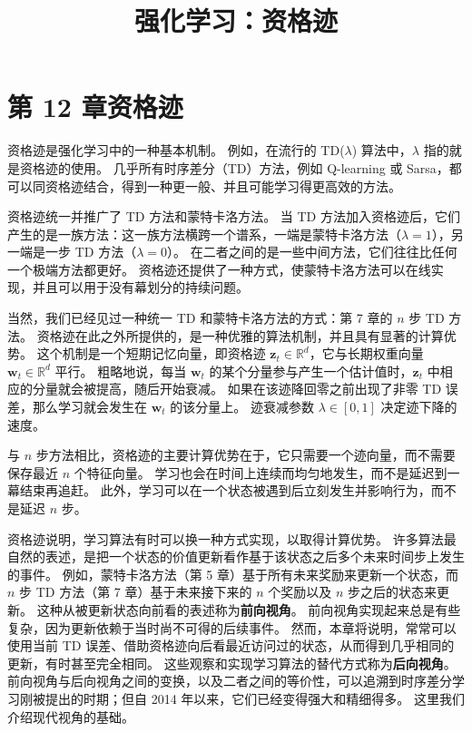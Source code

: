 \documentclass[UTF8, 12pt, fontset=fandol, oneside]{ctexart}
\title{强化学习：资格迹}
\author{}
\date{}
\begin{document}
\maketitle

\section*{第 12 章\quad 资格迹}

资格迹是强化学习中的一种基本机制。
例如，在流行的 TD($\lambda$) 算法中，$\lambda$ 指的就是资格迹的使用。
几乎所有时序差分（TD）方法，例如 Q-learning 或 Sarsa，都可以同资格迹结合，得到一种更一般、并且可能学习得更高效的方法。

资格迹统一并推广了 TD 方法和蒙特卡洛方法。
当 TD 方法加入资格迹后，它们产生的是一族方法：这一族方法横跨一个谱系，一端是蒙特卡洛方法（$\lambda=1$），另一端是一步 TD 方法（$\lambda=0$）。
在二者之间的是一些中间方法，它们往往比任何一个极端方法都更好。
资格迹还提供了一种方式，使蒙特卡洛方法可以在线实现，并且可以用于没有幕划分的持续问题。

当然，我们已经见过一种统一 TD 和蒙特卡洛方法的方式：第 7 章的 $n$ 步 TD 方法。
资格迹在此之外所提供的，是一种优雅的算法机制，并且具有显著的计算优势。
这个机制是一个短期记忆向量，即资格迹 $\mathbf{z}_t\in\mathbb{R}^d$，它与长期权重向量 $\mathbf{w}_t\in\mathbb{R}^d$ 平行。
粗略地说，每当 $\mathbf{w}_t$ 的某个分量参与产生一个估计值时，$\mathbf{z}_t$ 中相应的分量就会被提高，随后开始衰减。
如果在该迹降回零之前出现了非零 TD 误差，那么学习就会发生在 $\mathbf{w}_t$ 的该分量上。
迹衰减参数 $\lambda\in[0,1]$ 决定迹下降的速度。

与 $n$ 步方法相比，资格迹的主要计算优势在于，它只需要一个迹向量，而不需要保存最近 $n$ 个特征向量。
学习也会在时间上连续而均匀地发生，而不是延迟到一幕结束再追赶。
此外，学习可以在一个状态被遇到后立刻发生并影响行为，而不是延迟 $n$ 步。

资格迹说明，学习算法有时可以换一种方式实现，以取得计算优势。
许多算法最自然的表述，是把一个状态的价值更新看作基于该状态之后多个未来时间步上发生的事件。
例如，蒙特卡洛方法（第 5 章）基于所有未来奖励来更新一个状态，而 $n$ 步 TD 方法（第 7 章）基于未来接下来的 $n$ 个奖励以及 $n$ 步之后的状态来更新。
这种从被更新状态向前看的表述称为\textbf{前向视角}。
前向视角实现起来总是有些复杂，因为更新依赖于当时尚不可得的后续事件。
然而，本章将说明，常常可以使用当前 TD 误差、借助资格迹向后看最近访问过的状态，从而得到几乎相同的更新，有时甚至完全相同。
这些观察和实现学习算法的替代方式称为\textbf{后向视角}。
前向视角与后向视角之间的变换，以及二者之间的等价性，可以追溯到时序差分学习刚被提出的时期；但自 2014 年以来，它们已经变得强大和精细得多。
这里我们介绍现代视角的基础。
\end{document}

